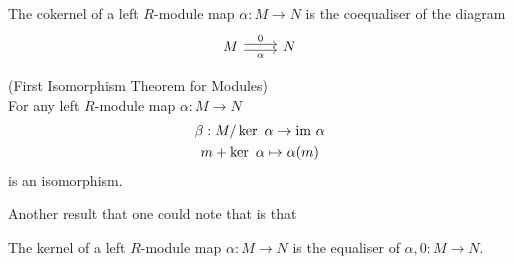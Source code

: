 \begin{corollary}
    The cokernel of a left $R$-module map $\alpha : M\rightarrow N$ is the coequaliser of the diagram 
    $$
        \begin{tikzcd}
            M \arrow[r, shift right=0.5ex, "\alpha", swap] \arrow[r, shift left=0.5ex,"0"] & N 
        \end{tikzcd} 
    $$
\end{corollary}
\begin{corollary}\label{FirstIsomorphismTheoremForModules}(First Isomorphism Theorem for Modules)\\ 
For any left $R$-module map $\alpha : M\rightarrow N$ 
    \begin{gather*}
        \beta : M/\ker \ \alpha \rightarrow \mathrm{im} \ \alpha\\
        m+ \ker \ \alpha \mapsto \alpha(m)
    \end{gather*}
is an isomorphism.
\end{corollary}
Another result that one could note that is that 
\begin{lemma}
    The kernel of a left $R$-module map $\alpha : M \rightarrow N$ is the equaliser of $\alpha,0 : M\rightarrow N$.
\end{lemma}

